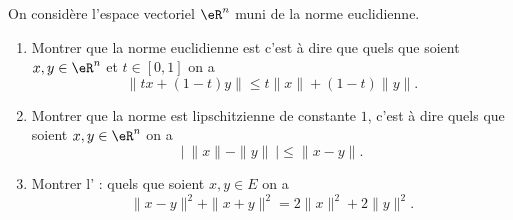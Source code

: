 \begin{exercice}[\minsyndical]\label{exoEspVectoNorme0001}

On considère l'espace vectoriel $\eR^n$ muni de la norme euclidienne.
\begin{enumerate}
	\item
		Montrer que la norme euclidienne est  c'est à dire que quels que soient  $ x,y  \in \eR^n $ et $ t \in [0,1]$ on a
		 \begin{equation}
	 		\|tx + (1-t)y\| \le t\|x\| + (1-t)\|y\|.
		 \end{equation}
	 
	\item
		 Montrer que la norme est lipschitzienne de constante $1$,  c'est à dire
	        quels que soient  $ x,y  \in \eR^n$ on a
		\begin{equation}
		         \left| \ \|x\| - \|y\| \ \right| \le \|x-y\|. 
		\end{equation}
 \item
	 Montrer l' :
        quels que soient  $ x,y  \in E $ on a
	\begin{equation}
	        \|x-y\|^2 + \|x+y\|^2 = 2\|x\|^2 + 2\|y\|^2 .
	\end{equation}
		
\end{enumerate}


\end{exercice}
